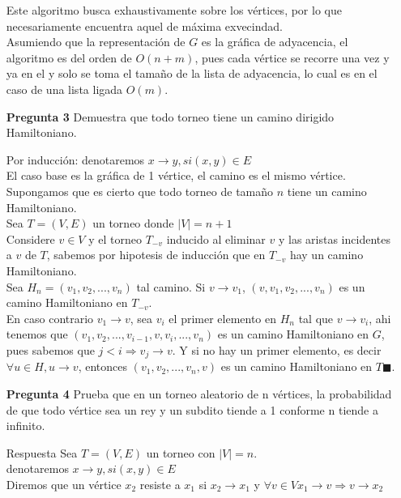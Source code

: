 \documentclass[12pt]{article}
\begin{document}
\begin{itemize}
Este algoritmo busca exhaustivamente sobre los vértices, por lo que necesariamente encuentra aquel de máxima exvecindad.\\
Asumiendo que la representación de $G$ es la gráfica de adyacencia, el algoritmo es del orden de $O(n + m)$, pues cada vértice se recorre una vez y ya en el y solo se toma el tamaño de la lista de adyacencia, lo cual es en el caso de una lista ligada $O(m)$.

\item[\bf{Pregunta 3}] Demuestra que todo torneo tiene un camino dirigido Hamiltoniano.
\item[Por inducción:]
  denotaremos $x \rightarrow  y, si (x,y)\in E$\\
  El caso base es la gráfica de 1 vértice, el camino es el mismo vértice.\\
  Supongamos que es cierto que todo torneo de tamaño $n$ tiene un camino Hamiltoniano.\\
  Sea $T=(V,E)$ un torneo donde $|V|=n+1$\\
  Considere $v \in V$ y el torneo $T_{-v}$ inducido al eliminar $v$ y las aristas incidentes a $v$ de $T$, sabemos por hipotesis de inducción que en $T_{-v}$ hay un camino Hamiltoniano.\\
    Sea $H_{n}=(v_1,v_2,...,v_n)$ tal camino.
      Si $v \rightarrow v_{1}$, $(v,v_1,v_2,...,v_n)$ es un camino Hamiltoniano en $T_{-v}$.\\
      En caso contrario $v_1 \rightarrow v$, sea $v_i$ el primer elemento en $H_{n}$ tal que $v \rightarrow v_i$, ahi tenemos que $(v_1,v_2,...,v_{i-1},v,v_i,...,v_n)$ es un camino Hamiltoniano en $G$, pues sabemos que $j<i \Rightarrow v_{j} \rightarrow v$.
      Y si no hay un primer elemento, es decir $\forall u \in H, u \rightarrow v$, entonces $(v_1,v_2,...,v_n,v)$ es un camino Hamiltoniano en $T \blacksquare$.\\

\item[\bf{Pregunta 4}] Prueba que en un torneo aleatorio de n vértices, la probabilidad de que todo vértice sea un rey y un subdito tiende a 1 conforme n tiende a infinito.

\item[Respuesta] 
Sea $T=(V,E)$ un torneo con $|V|=n$.\\ 
denotaremos $x \rightarrow  y, si (x,y)\in E$\\

Diremos que un vértice $x_2$ resiste a $x_1$ si $x_2 \rightarrow x_1$ y $\forall v \in V x_1 \rightarrow  v \Rightarrow v \rightarrow x_2$


\end{itemize}
\end{document}
